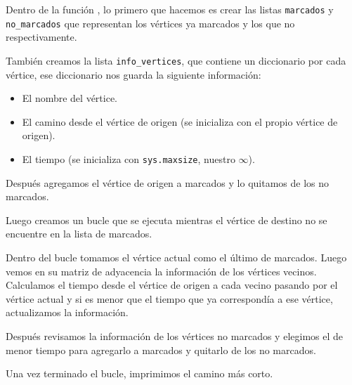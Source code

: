 \documentclass[
]{article}
\providecommand{\tightlist}{%
  \setlength{\itemsep}{0pt}\setlength{\parskip}{0pt}}
\begin{document}
Dentro de la función , lo primero que hacemos es crear las listas
\texttt{marcados} y \texttt{no\_marcados} que representan los vértices
ya marcados y los que no respectivamente.

También creamos la lista \texttt{info\_vertices}, que contiene un
diccionario por cada vértice, ese diccionario nos guarda la siguiente
información:

\begin{itemize}
\tightlist
\item
  El nombre del vértice.
\item
  El camino desde el vértice de origen (se inicializa con el propio
  vértice de origen).
\item
  El tiempo (se inicializa con \texttt{sys.maxsize}, nuestro $\infty$).
\end{itemize}

Después agregamos el vértice de origen a marcados y lo quitamos de los
no marcados.

Luego creamos un bucle que se ejecuta mientras el vértice de destino no
se encuentre en la lista de marcados.

Dentro del bucle tomamos el vértice actual como el último de marcados.
Luego vemos en su matriz de adyacencia la información de los vértices
vecinos. Calculamos el tiempo desde el vértice de origen a cada vecino
pasando por el vértice actual y si es menor que el tiempo que ya
correspondía a ese vértice, actualizamos la información.

Después revisamos la información de los vértices no marcados y elegimos
el de menor tiempo para agregarlo a marcados y quitarlo de los no
marcados.

Una vez terminado el bucle, imprimimos el camino más corto.
\end{document}

